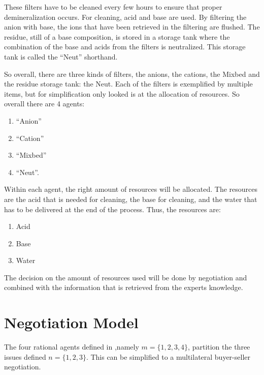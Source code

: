 These filters have to be cleaned every few hours to ensure that proper demineralization occurs. For cleaning, acid and base are used. By filtering the anion with base, the ions that have been retrieved in the filtering are flushed. The residue, still of a base composition, is stored in a storage tank where the combination of the base and acids from the filters is neutralized. This storage tank is called the ``Neut'' shorthand.

So overall, there are three kinds of filters, the anions, the cations, the Mixbed and the residue storage tank: the Neut. Each of the filters is exemplified by multiple items, but for simplification only looked is at the allocation of resources. So overall there are 4 agents:
\begin{enumerate}
	\item``Anion''
	\item``Cation''
	\item``Mixbed''
	\item``Neut''.
\end{enumerate}
Within each agent, the right amount of resources will be allocated. The resources are the acid that is needed for cleaning, the base for cleaning, and the water that has to be delivered at the end of the process. Thus, the resources are:
\begin{enumerate}
	\item Acid
	\item Base
	\item Water
\end{enumerate}
 The decision on the amount of resources used will be done by negotiation and combined with the information that is retrieved from the experts knowledge.


\section{Negotiation Model}
\label{sec:design:negmod}
The four rational agents defined in ,namely $m = \{1,2,3, 4\}$, partition the  three issues defined $n=\{1,2,3\}$. This can be simplified to a multilateral buyer-seller negotiation.

